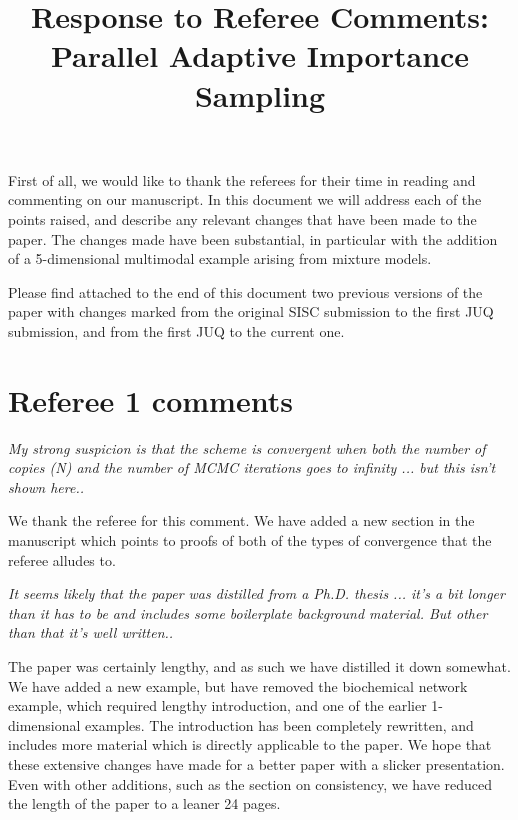 \documentclass{article}
\newcommand{\comment}[2]{\vspace{0.6cm}{\bf Comment:} {\it #1.}

\vspace{0.3cm}{\bf Answer:} #2}
\begin{document}
\title{Response to Referee Comments: Parallel Adaptive Importance Sampling}
\maketitle
First of all, we would like to thank the referees for
their time in reading and commenting on our manuscript. In this document
we will address each of the points raised, and describe any relevant
changes that have been made to the paper. The changes made have been substantial, in particular with the addition of a 5-dimensional multimodal example arising from mixture models.

Please find attached to the end of this document two previous versions of the paper with changes marked from the original SISC submission to the first JUQ submission, and from the first JUQ to the current one.


\section*{Referee 1 comments}
\comment{My strong suspicion is that the scheme is convergent when both the number of copies (N) and the number of MCMC iterations goes to infinity ... but this isn't shown here.}{We thank the referee for this comment. We have added a new section in the manuscript which points to proofs of both of the types of convergence that the referee alludes to.}

\comment{It seems likely that the paper was distilled from a Ph.D. thesis ... it's a bit longer than it has to be and includes some boilerplate background material. But other than that it's well written.}{The paper was certainly lengthy, and as such we have distilled it down somewhat. We have added a new example, but have removed the biochemical network example, which required lengthy introduction, and one of the earlier 1-dimensional examples. The introduction has been completely rewritten, and includes more material which is directly applicable to the paper. We hope that these extensive changes have made for a better paper with a slicker presentation. Even with other additions, such as the section on consistency, we have reduced the length of the paper to a leaner 24 pages.}
\end{document}
